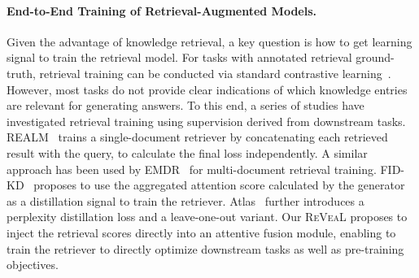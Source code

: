 \documentclass[10pt,twocolumn,letterpaper]{article}
\newcommand{\method}{R\textsc{e}V\textsc{ea}L\xspace}
\begin{document}
\paragraph{End-to-End Training of Retrieval-Augmented Models.}
Given the advantage of knowledge retrieval, a key question is how to get learning signal to train the retrieval model. For tasks with annotated retrieval ground-truth, retrieval training can be conducted via standard contrastive learning~\cite{DBLP:journals/corr/abs-2004-04906}. However, most tasks do not provide clear indications of which knowledge entries are relevant for generating answers. To this end, a series of studies have investigated retrieval training using supervision derived from downstream tasks.
REALM~\cite{DBLP:journals/corr/abs-2002-08909} trains a single-document retriever by concatenating each retrieved result with the query, to calculate the final loss independently. A similar approach has been used by EMDR~\cite{DBLP:conf/nips/SachanRHDY21F} for multi-document retrieval training. FID-KD~\cite{izacard2020distilling} proposes to use the aggregated attention score calculated by the generator as a distillation signal to train the retriever. Atlas~\cite{DBLP:journals/corr/abs-2208-03299} further introduces a perplexity distillation loss and a leave-one-out variant. Our \method proposes to inject the retrieval scores directly into an attentive fusion module, enabling to train the retriever to directly optimize downstream tasks as well as pre-training objectives. 
\end{document}
